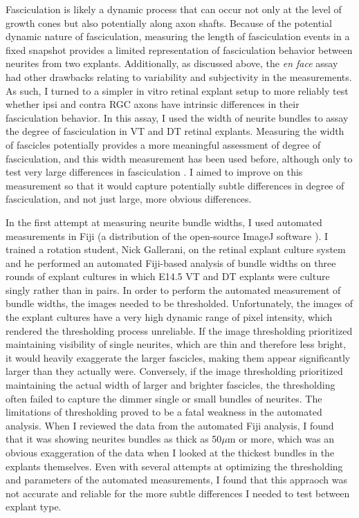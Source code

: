 Fasciculation is likely a dynamic process that can occur not only at the level of growth cones but also potentially along axon shafts.
Because of the potential dynamic nature of fasciculation, measuring the length of fasciculation events in a fixed snapshot provides a limited representation of fasciculation behavior between neurites from two explants.
Additionally, as discussed above, the \emph{en face} assay had other drawbacks relating to variability and subjectivity in the measurements.
As such, I turned to a simpler in vitro retinal explant setup to more reliably test whether ipsi and contra RGC axons have intrinsic differences in their fasciculation behavior.
In this assay, I used the width of neurite bundles to assay the degree of fasciculation in VT and DT retinal explants.
Measuring the width of fascicles potentially provides a more meaningful assessment of degree of fasciculation, and this width measurement has been used before, although only to test very large differences in fasciculation \cite{jaworski2012autocrine}.
I aimed to improve on this measurement so that it would capture potentially subtle differences in degree of fasciculation, and not just large, more obvious differences.

In the first attempt at measuring neurite bundle widths, I used automated measurements in Fiji (a distribution of the open-source ImageJ software \cite{schindelin2012fiji}).
I trained a rotation student, Nick Gallerani, on the retinal explant culture system and he performed an automated Fiji-based analysis of bundle widths on three rounds of explant cultures in which E14.5 VT and DT explants were culture singly rather than in pairs.
In order to perform the automated measurement of bundle widths, the images needed to be thresholded.
Unfortunately, the images of the explant cultures have a very high dynamic range of pixel intensity, which rendered the thresholding process unreliable.
If the image thresholding prioritized maintaining visibility of single neurites, which are thin and therefore less bright, it would heavily exaggerate the larger fascicles, making them appear significantly larger than they actually were.
Conversely, if the image thresholding prioritized maintaining the actual width of larger and brighter fascicles, the thresholding often failed to capture the dimmer single or small bundles of neurites.
The limitations of thresholding proved to be a fatal weakness in the automated analysis.
When I reviewed the data from the automated Fiji analysis, I found that it was showing neurites bundles as thick as 50$\mu$m or more, which was an obvious exaggeration of the data when I looked at the thickest bundles in the explants themselves.
Even with several attempts at optimizing the thresholding and parameters of the automated measurements, I found that this appraoch was not accurate and reliable for the more subtle differences I needed to test between explant type.

